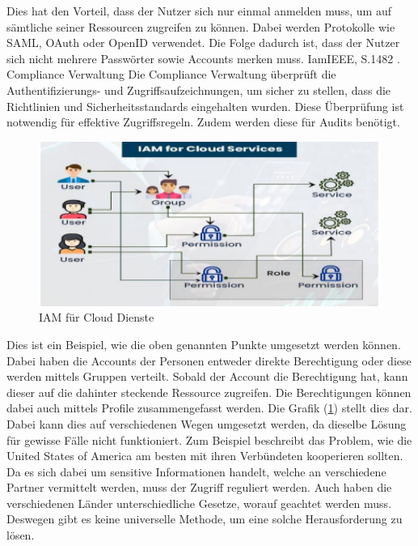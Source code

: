 Dies hat den Vorteil, dass der Nutzer sich nur einmal anmelden muss, um auf sämtliche seiner Ressourcen zugreifen zu können.
Dabei werden Protokolle wie SAML, OAuth oder OpenID verwendet.
Die Folge dadurch ist, dass der Nutzer sich nicht mehrere Passwörter sowie Accounts merken muss. {IamIEEE, S.1482} 
\newline
{}. Compliance Verwaltung
\newline
Die Compliance Verwaltung überprüft die Authentifizierungs- und Zugriffsaufzeichnungen, um sicher zu stellen, dass die Richtlinien und Sicherheitsstandards eingehalten wurden.
Diese Überprüfung ist notwendig für effektive Zugriffsregeln.
Zudem werden diese für Audits benötigt. \cite{IamIEEE, S.1482} 
\newline
\newline
\begin{figure}[h!]
 \centering
 \includegraphics[width=1\textwidth]{gfx/Picture/IAMISH.PNG}
 \caption{IAM für Cloud Dienste \cite{Moha19, S.3}}
 \label{fig:IMAISH}
\end{figure}
Dies ist ein Beispiel, wie die oben genannten Punkte umgesetzt werden können.
Dabei haben die Accounts der Personen entweder direkte Berechtigung oder diese werden mittels Gruppen verteilt.
Sobald der Account die Berechtigung hat, kann dieser auf die dahinter steckende Ressource zugreifen.
Die Berechtigungen können dabei auch mittels Profile zusammengefasst werden.
Die Grafik (\ref{fig:IMAISH}) stellt dies dar.
\newline
Dabei kann dies auf verschiedenen Wegen umgesetzt werden, da dieselbe Lösung für gewisse Fälle nicht funktioniert.
Zum Beispiel beschreibt \cite{Cal17, S.208} das Problem, wie die United States of America am besten mit ihren Verbündeten kooperieren sollten.
Da es sich dabei um sensitive Informationen handelt, welche an verschiedene Partner vermittelt werden, muss der Zugriff reguliert werden.
Auch haben die verschiedenen Länder unterschiedliche Gesetze, worauf geachtet werden muss. 
Deswegen gibt es keine universelle Methode, um eine solche Herausforderung zu lösen. \cite{Cal17, S.208}


